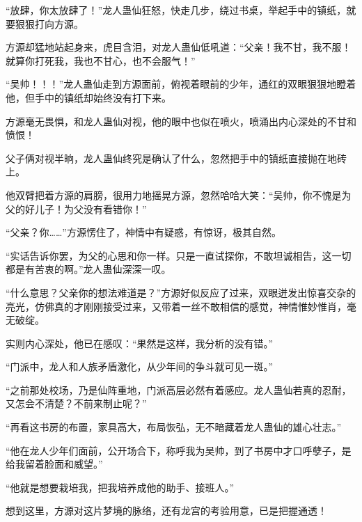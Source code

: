 \begin{this_body}
“放肆，你太放肆了！”龙人蛊仙狂怒，快走几步，绕过书桌，举起手中的镇纸，就要狠狠打向方源。

方源却猛地站起身来，虎目含泪，对龙人蛊仙低吼道：“父亲！我不甘，我不服！就算你打死我，我也不甘心，也不会服气！”

“吴帅！！！”龙人蛊仙走到方源面前，俯视着眼前的少年，通红的双眼狠狠地瞪着他，但手中的镇纸却始终没有打下来。

方源毫无畏惧，和龙人蛊仙对视，他的眼中也似在喷火，喷涌出内心深处的不甘和愤恨！

父子俩对视半晌，龙人蛊仙终究是确认了什么，忽然把手中的镇纸直接抛在地砖上。

他双臂把着方源的肩膀，很用力地摇晃方源，忽然哈哈大笑：“吴帅，你不愧是为父的好儿子！为父没有看错你！”

“父亲？你……”方源愣住了，神情中有疑惑，有惊讶，极其自然。

“实话告诉你罢，为父的心思和你一样。只是一直试探你，不敢坦诚相告，这一切都是有苦衷的啊。”龙人蛊仙深深一叹。

“什么意思？父亲你的想法难道是？”方源好似反应了过来，双眼迸发出惊喜交杂的亮光，仿佛真的才刚刚接受过来，又带着一丝不敢相信的感觉，神情惟妙惟肖，毫无破绽。

实则内心深处，他已在感叹：“果然是这样，我分析的没有错。”

“门派中，龙人和人族矛盾激化，从少年间的争斗就可见一斑。”

“之前那处校场，乃是仙阵重地，门派高层必然有着感应。龙人蛊仙若真的忍耐，又怎会不清楚？不前来制止呢？”

“再看这书房的布置，家具高大，布局恢弘，无不暗藏着龙人蛊仙的雄心壮志。”

“他在龙人少年们面前，公开场合下，称呼我为吴帅，到了书房中才口呼孽子，是给我留着脸面和威望。”

“他就是想要栽培我，把我培养成他的助手、接班人。”

想到这里，方源对这片梦境的脉络，还有龙宫的考验用意，已是把握通透！

\end{this_body}


